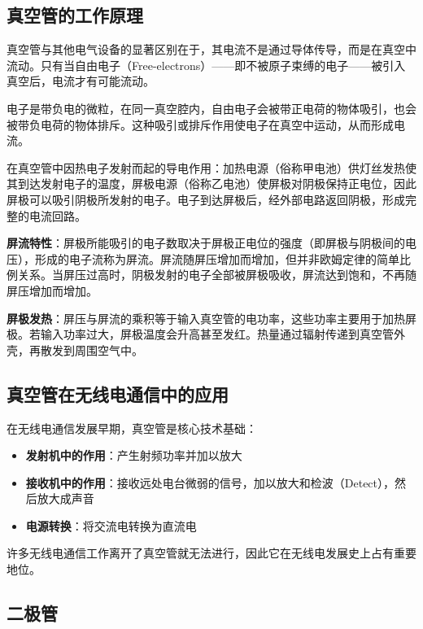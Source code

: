 \subsection{真空管的工作原理}
\label{subsec:vacuum_tube_operation}

真空管与其他电气设备的显著区别在于，其电流不是通过导体传导，而是在真空中流动。只有当自由电子（Free-electrons）——即不被原子束缚的电子——被引入真空后，电流才有可能流动。

电子是带负电的微粒，在同一真空腔内，自由电子会被带正电荷的物体吸引，也会被带负电荷的物体排斥。这种吸引或排斥作用使电子在真空中运动，从而形成电流。

在真空管中因热电子发射而起的导电作用：加热电源（俗称甲电池）供灯丝发热使其到达发射电子的温度，屏极电源（俗称乙电池）使屏极对阴极保持正电位，因此屏极可以吸引阴极所发射的电子。电子到达屏极后，经外部电路返回阴极，形成完整的电流回路。

\textbf{屏流特性}：屏极所能吸引的电子数取决于屏极正电位的强度（即屏极与阴极间的电压），形成的电子流称为屏流。屏流随屏压增加而增加，但并非欧姆定律的简单比例关系。当屏压过高时，阴极发射的电子全部被屏极吸收，屏流达到饱和，不再随屏压增加而增加。

\textbf{屏极发热}：屏压与屏流的乘积等于输入真空管的电功率，这些功率主要用于加热屏极。若输入功率过大，屏极温度会升高甚至发红。热量通过辐射传递到真空管外壳，再散发到周围空气中。

\subsection{真空管在无线电通信中的应用}
\label{subsec:vacuum_tube_applications}

在无线电通信发展早期，真空管是核心技术基础：

\begin{itemize}
    \item \textbf{发射机中的作用}：产生射频功率并加以放大
    \item \textbf{接收机中的作用}：接收远处电台微弱的信号，加以放大和检波（Detect），然后放大成声音
    \item \textbf{电源转换}：将交流电转换为直流电
\end{itemize}

许多无线电通信工作离开了真空管就无法进行，因此它在无线电发展史上占有重要地位。

\subsection{二极管}
\label{subsec:diode}

